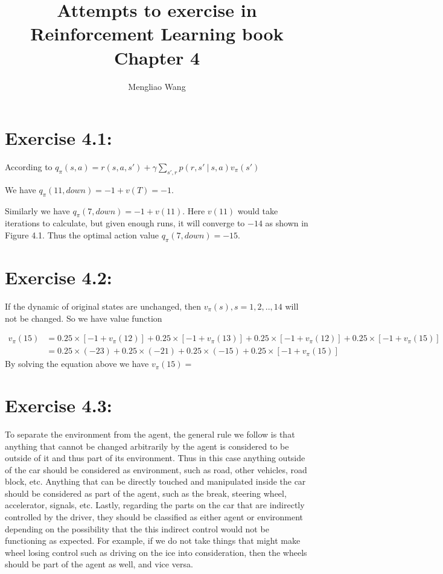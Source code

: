 \documentclass[10pt,letterpaper]{article}
\title{Attempts to exercise in Reinforcement Learning book Chapter 4}
\author{Mengliao Wang}
\newcommand\given[1][]{\:#1\vert\:}
\begin{document}
\maketitle



\section*{Exercise 4.1: }
\label{4.1}

According to $q_\pi(s,a) = r(s,a,s') + \gamma\sum_{s',r}p(r,s'\given s,a)v_\pi(s')$

We have $q_\pi(11, down) = -1 + v(T) = -1$.

Similarly we have $q_\pi(7, down) = -1 + v(11)$. Here $v(11)$ would take iterations to calculate, but given enough runs, it will converge to $-14$ as shown in Figure 4.1. Thus the optimal action value $q_\pi(7, down) = -15$.

\section*{Exercise 4.2: }
\label{4.2}

If the dynamic of original states are unchanged, then $v_\pi(s), s=1,2,..,14$ will not be changed. So we have value function 

\begin{align}
v_\pi(15) &= 0.25\times[-1 + v_\pi(12)] + 0.25\times[-1 + v_\pi(13)]  + 0.25\times[-1 + v_\pi(12)] + 0.25\times[-1 + v_\pi(15)]\\
&= 0.25\times(-23) + 0.25\times(-21)  + 0.25\times(-15) + 0.25\times[-1 + v_\pi(15)]
\end{align}
By solving the equation above we have $v_\pi(15) = $


\section*{Exercise 4.3: }
\label{4.3}

To separate the environment from the agent, the general rule we follow is that anything that cannot be changed arbitrarily by the agent is considered to be outside of it and thus part of its environment. Thus in this case anything outside of the car should be considered as environment, such as road, other vehicles, road block, etc. Anything that can be directly touched and manipulated inside the car should be considered as part of the agent, such as the break, steering wheel, accelerator, signals, etc. Lastly, regarding the parts on the car that are indirectly controlled by the driver, they should be classified as either agent or environment depending on the possibility that the this indirect control would not be functioning as expected. For example, if we do not take things that might make wheel losing control such as driving on the ice into consideration, then the wheels should be part of the agent as well, and vice versa.
\end{document}
